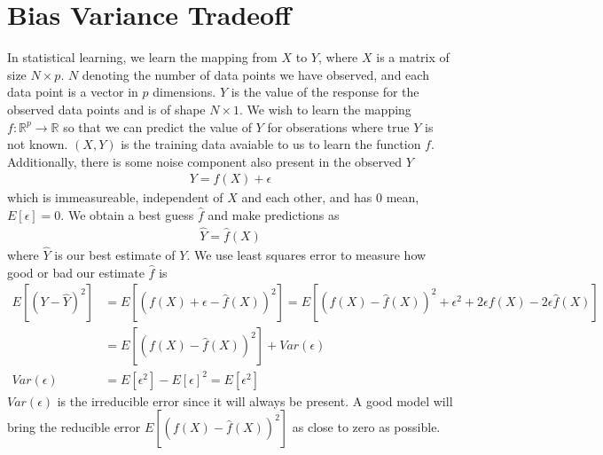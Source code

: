 \documentclass[../statistical_learning_notes.tex]{subfiles}
\begin{document}
\section{Bias Variance Tradeoff}
In statistical learning, we learn the mapping from $X$ to $Y$, where $X$ is a matrix of size $N \times p$. $N$ denoting the number of data points we have observed, and each data point is a vector in $p$ dimensions. $Y$ is the value of the response for the observed data points and is of shape $N \times 1$. We wish to learn the mapping $f:\mathbb{R}^{p} \rightarrow \mathbb{R}$ so that we can predict the value of $Y$ for obserations where true $Y$ is not known. $(X, Y)$ is the training data avaiable to us to learn the function $f$. Additionally, there is some noise component also present in the observed $Y$
\begin{align*}
    Y = f(X) + \epsilon
\end{align*}
which is immeasureable, independent of $X$ and each other, and has $0$ mean, $E[\epsilon] = 0$. We obtain a best guess $\hat{f}$ and make predictions as
\begin{align*}
    \hat{Y} = \hat{f}(X)
\end{align*}
where $\hat{Y}$ is our best estimate of $Y$. We use least squares error to measure how good or bad our estimate $\hat{f}$ is
\begin{align*}
    E[(Y - \hat{Y})^{2}] &= E[(f(X) + \epsilon - \hat{f}(X))^{2}] = E[(f(X) - \hat{f}(X))^{2} + \epsilon^{2} + 2\epsilon f(X) - 2\epsilon \hat{f}(X)]\\
    &= E[(f(X) - \hat{f}(X))^{2}] + Var(\epsilon)\\
    Var(\epsilon) &= E[\epsilon^{2}] - E[\epsilon]^{2} = E[\epsilon^{2}]
\end{align*}
$Var(\epsilon)$ is the irreducible error since it will always be present. A good model will bring the reducible error $E[(f(X) - \hat{f}(X))^{2}]$ as close to zero as possible.\newline
\end{document}
